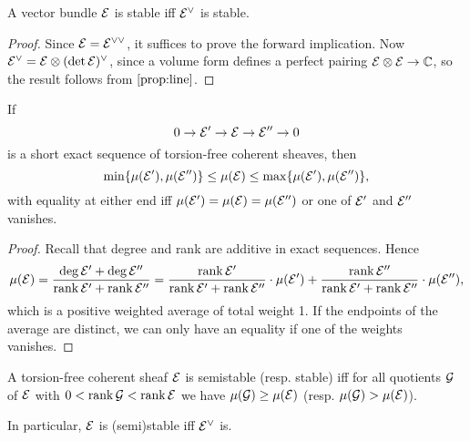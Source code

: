 \begin{proposition}\label{prop:stable dual}
    A vector bundle $\mathcal{E}$ is stable iff $\mathcal{E}^\vee$ is stable.
\end{proposition}

\begin{proof}
    Since $\mathcal{E}=\mathcal{E}^{\vee\vee}$, it suffices to prove the forward
    implication. Now $\mathcal{E}^\vee=\mathcal{E}\otimes(\det\mathcal{E})^\vee$, since a volume
    form defines a perfect pairing $\mathcal{E}\otimes\mathcal{E}\to\mathbb{C}$, so the result
    follows from $\cref{prop:line}$.
\end{proof}

\begin{proposition}\label{prop:slope SES}
    If
    \begin{equation*}
        0\to\mathcal{E}'\to\mathcal{E}\to\mathcal{E}''\to0
    \end{equation*}
    is a short exact sequence of torsion-free coherent sheaves, then
    \begin{equation*}
        \min\{\mu(\mathcal{E}'),\mu(\mathcal{E}'')\}
            \le \mu(\mathcal{E}) \le \max\{\mu(\mathcal{E}'),\mu(\mathcal{E}'')\},
    \end{equation*}
    with equality at either end iff $\mu(\mathcal{E}')=\mu(\mathcal{E})=\mu(\mathcal{E}'')$ or one
    of $\mathcal{E}'$ and $\mathcal{E}''$ vanishes.
\end{proposition}

\begin{proof}
    Recall that degree and rank are additive in exact sequences. Hence
    \begin{align*}
        \mu(\mathcal{E})
            = \frac{\deg\mathcal{E}'+\deg\mathcal{E}''}{\operatorname{rank}\mathcal{E}'+\operatorname{rank}\mathcal{E}''}
            = \frac{\operatorname{rank}\mathcal{E}'}{\operatorname{rank}\mathcal{E}'+\operatorname{rank}\mathcal{E}''}\cdot\mu(\mathcal{E}')
            + \frac{\operatorname{rank}\mathcal{E}''}{\operatorname{rank}\mathcal{E}'+\operatorname{rank}\mathcal{E}''}\cdot\mu(\mathcal{E}''),
    \end{align*}
    which is a positive weighted average of total weight 1. If the endpoints of
    the average are distinct, we can only have an equality if one of the weights
    vanishes.
\end{proof}

\begin{proposition}\label{prop:duality}
    A torsion-free coherent sheaf $\mathcal{E}$ is semistable (resp. stable) iff for
    all quotients $\mathcal{G}$ of $\mathcal{E}$ with $0<\operatorname{rank}\mathcal{G}<\operatorname{rank}\mathcal{E}$ we have
    $\mu(\mathcal{G})\ge\mu(\mathcal{E})$ (resp. $\mu(\mathcal{G})>\mu(\mathcal{E})$).

    In particular, $\mathcal{E}$ is (semi)stable iff $\mathcal{E}^\vee$ is.
\end{proposition}

